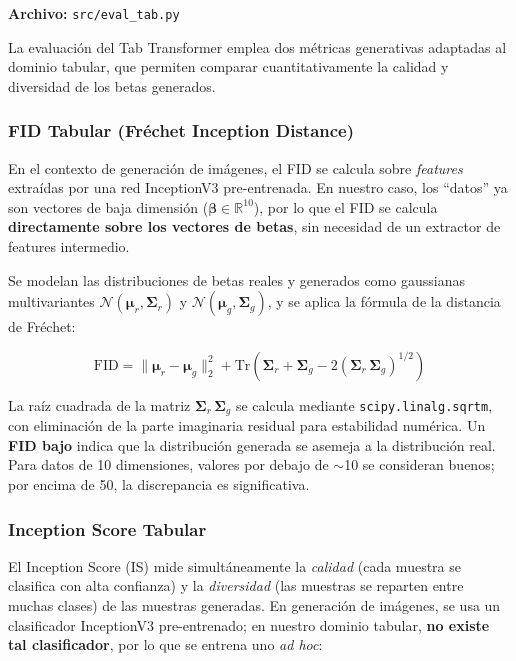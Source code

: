 \documentclass[a4paper,11pt]{article}
\begin{document}
\textbf{Archivo:} \texttt{src/eval\_tab.py}

La evaluación del Tab Transformer emplea dos métricas generativas
adaptadas al dominio tabular, que permiten comparar cuantitativamente
la calidad y diversidad de los betas generados.

\subsubsection{FID Tabular (Fréchet Inception Distance)}

En el contexto de generación de imágenes, el FID se calcula sobre
\emph{features} extraídas por una red InceptionV3 pre-entrenada. En nuestro
caso, los ``datos'' ya son vectores de baja dimensión
($\bm{\beta}\in\mathbb{R}^{10}$), por lo que el FID se calcula
\textbf{directamente sobre los vectores de betas}, sin necesidad de un
extractor de features intermedio.

Se modelan las distribuciones de betas reales y generados como
gaussianas multivariantes $\mathcal{N}(\bm{\mu}_r, \bm{\Sigma}_r)$ y
$\mathcal{N}(\bm{\mu}_g, \bm{\Sigma}_g)$, y se aplica la fórmula de la
distancia de Fréchet:

\begin{equation}
    \label{eq:fid}
    \text{FID} = \|\bm{\mu}_r - \bm{\mu}_g\|^2_2
    + \text{Tr}\!\left(\bm{\Sigma}_r + \bm{\Sigma}_g
    - 2\left(\bm{\Sigma}_r\,\bm{\Sigma}_g\right)^{1/2}\right)
\end{equation}

La raíz cuadrada de la matriz $\bm{\Sigma}_r\,\bm{\Sigma}_g$ se calcula
mediante \texttt{scipy.linalg.sqrtm}, con eliminación de la parte
imaginaria residual para estabilidad numérica. Un \textbf{FID bajo}
indica que la distribución generada se asemeja a la distribución real.
Para datos de 10 dimensiones, valores por debajo de $\sim$10 se
consideran buenos; por encima de 50, la discrepancia es significativa.

\subsubsection{Inception Score Tabular}

El Inception Score (IS) mide simultáneamente la \emph{calidad} (cada muestra
se clasifica con alta confianza) y la \emph{diversidad} (las muestras se
reparten entre muchas clases) de las muestras generadas. En generación de
imágenes, se usa un clasificador InceptionV3 pre-entrenado; en nuestro
dominio tabular, \textbf{no existe tal clasificador}, por lo que se entrena
uno \emph{ad hoc}:
\end{document}
